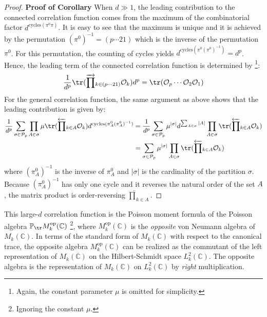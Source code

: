 \documentclass[a4paper,11pt]{article}
\theoremstyle{definition}
\numberwithin{equation}{section}
\begin{document}
\begin{proof}
    \textbf{Proof of Corollary}
    When $d \gg 1$, the leading contribution to the connected correlation function comes from the maximum of the combinatorial factor $d^{\text{cycles}(\pi^0\pi)}$. It is easy to see that the maximum is unique and it is achieved by the permutation $(\pi^0)^{-1} = (p\cdots21)$ which is the inverse of the permutation $\pi^0$. For this permutation, the counting of cycles yields $d^{\text{cycles}(\pi^0(\pi^0)^{-1})} = d^p$. Hence, the leading term of the connected correlation function is determined by \footnote{Again, the constant parameter $\mu$ is omitted for simplicity.}:
    \begin{equation}
        \frac{1}{d^p}\tr(\overrightarrow{\prod}_{k\in (p\cdots21)}\mathcal{O}_k)d^p = \tr(\mathcal{O}_p\cdots\mathcal{O}_2\mathcal{O}_1)
    \end{equation}
    For the general correlation function, the same argument as above shows that the leading contribution is given by:
    \begin{align}
        \begin{split}
            \frac{1}{d^p}\sum_{\sigma\in\mathcal{P}_p}\prod_{A\in\sigma}\mu\tr(\overleftarrow{\prod}_{k\in A}\mathcal{O}_k)d^{\text{cycles}(\pi_A^0(\pi_A^0)^{-1})} &= \frac{1}{d^p}\sum_{\sigma\in\mathcal{P}_p}\mu^{|\sigma|}d^{\sum_{A\in\sigma}|A|}\prod_{A\in\sigma}\tr(\overleftarrow{\prod}_{k\in A}\mathcal{O}_k)
            \\& = \sum_{\sigma\in\mathcal{P}_p}\mu^{|\sigma|}\prod_{A\in\sigma}\tr(\overleftarrow{\prod}_{k\in A}\mathcal{O}_k)
        \end{split}
    \end{align}
    where $(\pi_A^0)^{-1}$ is the inverse of $\pi_A^0$ and $|\sigma|$ is the cardinality of the partition $\sigma$. Because $(\pi_A^0)^{-1}$ has only one cycle and it reverses the natural order of the set $A$, the matrix product is order-reversing $\overleftarrow{\prod}_{k\in A}$.
\end{proof}
This large-$d$ correlation function is the Poisson moment formula of the Poisson algebra $\mathbb{P}_{\tr}M^\text{op}_k(\mathbb{C})$ \footnote{Ignoring the constant $\mu$.}, where $M^\text{op}_k(\mathbb{C})$ is the \textit{opposite} von Neumann algebra of $M_k(\mathbb{C})$. In terms of the standard form of $M_k(\mathbb{C})$ with respect to the canonical trace, the opposite algebra $M^\text{op}_k(\mathbb{C})$ can be realized as the commutant of the left representation of $M_k(\mathbb{C})$ on the Hilbert-Schmidt space $L^2_k(\mathbb{C})$. The opposite algebra is the representation of $M_k(\mathbb{C})$ on $L^2_k(\mathbb{C})$ by \textit{right} multiplication. 
\end{document}
